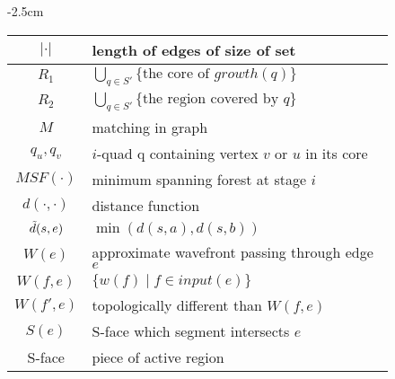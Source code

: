 \begin{figure}
\begin{center}
    \addtolength{\leftskip} {-2.5cm} %
    \addtolength{\rightskip}{-2.5cm}
\begin{tabular}{| c | l |}
    \hline
	$|\cdot|$ & length of edges of size of set \\
	\hline
	$R_1$ & $\bigcup_{q \in S'} \{\text{the core of } growth(q)\}$ \\
	\hline
	$R_2$ & $\bigcup_{q \in S'} \{\text{the region covered by } q\}$ \\
	\hline
	$M$ & matching in graph \\
	\hline
	$q_u, q_v$ & $i$-quad q containing vertex $v$ or $u$ in its core \\
	\hline
	$MSF(\cdot)$ & minimum spanning forest at stage $i$ \\
	\hline
	$d(\cdot, \cdot)$ & distance function \\
	\hline
	$\Tilde{d}(s,e)$ & $\min(d(s,a),d(s,b))$ \\
	\hline
	$W(e)$ & approximate wavefront passing through edge $e$ \\
	\hline
	$W(f,e)$ & $\{w(f) \mid f \in input(e)\}$ \\
	\hline
	$W(f',e)$ & topologically different than $W(f,e)$ \\
	\hline
	$S(e)$ & S-face which segment intersects $e$ \\
	\hline
	S-face & piece of active region
	\hline
\end{tabular}
\end{center}
\end{figure}